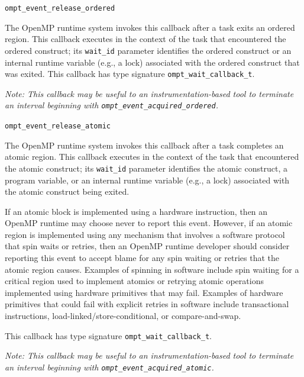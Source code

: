 \documentclass{article}
\newcommand{\descheader}[1]{{\needspace{3\baselineskip}\vspace{1em}\noindent \fbox{#1}}}
\begin{document}
\descheader{Ordered Release}

\begin{description}

\item \verb|ompt_event_release_ordered|

   The OpenMP runtime system invokes this callback
after a task
   exits an ordered region. This callback executes in the
   context of the task that encountered the ordered construct; its \verb|wait_id| parameter identifies the ordered construct or an internal runtime variable (e.g., a lock) associated with the ordered construct that was exited.
   This callback has type signature \verb|ompt_wait_callback_t|. 
   
        {\em Note: This callback may be useful to an instrumentation-based tool to terminate an interval beginning with  
       \verb|ompt_event_acquired_ordered|.}
\end{description}


\descheader{Atomic Release}

\begin{description}
\item \verb|ompt_event_release_atomic|

   The OpenMP runtime system invokes this callback after a task
   completes an atomic region. This callback executes in the
   context of the task that encountered the atomic construct; its \verb|wait_id| parameter identifies the atomic construct, a program variable, or an internal runtime variable (e.g., a lock) associated with the atomic construct being exited.
      
If an atomic block is implemented using a hardware instruction, then an OpenMP runtime may choose never to report this event. 
However, if an atomic region is implemented  using any mechanism that involves a software protocol that spin waits or retries, then an OpenMP runtime developer should consider reporting this event  to accept blame for any spin waiting or retries that the atomic region causes.
Examples of spinning in software include spin waiting for a critical region used to implement atomics or retrying atomic operations implemented using hardware primitives that may fail. Examples of hardware primitives that could fail with explicit retries in software include transactional instructions,  load-linked/store-conditional, or compare-and-swap.
   
   This callback has type signature \verb|ompt_wait_callback_t|. 
   
        {\em Note: This callback may be useful to an instrumentation-based tool to terminate an interval beginning with  
       \verb|ompt_event_acquired_atomic|.}
\end{description}
\end{document}
